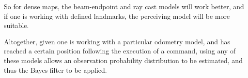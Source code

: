 \documentclass[a4paper]{article}
\begin{document}
So for dense maps, the beam-endpoint and ray cast models will work better, and if one is working with defined landmarks, the perceiving model will be more suitable.

Altogether, given one is working with a particular odometry model, and has reached a certain position following the execution of a command, using any of these models allows an observation probability distribution to be estimated, and thus the Bayes filter to be applied.

\pagebreak

\end{document}
